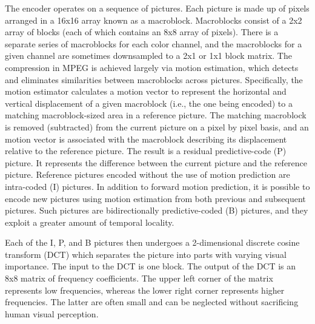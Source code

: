 The encoder operates on a sequence of pictures. Each picture is made
up of pixels arranged in a 16x16 array known as a macroblock.
Macroblocks consist of a 2x2 array of blocks (each of which contains
an 8x8 array of pixels).  There is a separate series of macroblocks
for each color channel, and the macroblocks for a given channel are
sometimes downsampled to a 2x1 or 1x1 block matrix.  The compression
in MPEG is achieved largely via motion estimation, which detects and
eliminates similarities between macroblocks across
pictures. Specifically, the motion estimator calculates a motion
vector to represent the horizontal and vertical displacement of a
given macroblock (i.e., the one being encoded) to a matching
macroblock-sized area in a reference picture.  The matching macroblock
is removed (subtracted) from the current picture on a pixel by pixel
basis, and an motion vector is associated with the macroblock
describing its displacement relative to the reference picture. The
result is a residual predictive-code (P) picture. It represents the
difference between the current picture and the reference
picture. Reference pictures encoded without the use of motion
prediction are intra-coded (I) pictures. In addition to forward motion
prediction, it is possible to encode new pictures using motion
estimation from both previous and subsequent pictures. Such pictures
are bidirectionally predictive-coded (B) pictures, and they exploit a
greater amount of temporal locality.

Each of the I, P, and B pictures then undergoes a 2-dimensional
discrete cosine transform (DCT) which separates the picture into parts
with varying visual importance. The input to the DCT is one block.
The output of the
DCT is an 8x8 matrix of frequency coefficients. The upper left corner
of the matrix represents low frequencies, whereas the lower right
corner represents higher frequencies. The latter are often small and
can be neglected without sacrificing human visual perception.


